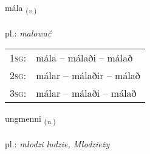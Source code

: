 \documentclass[frontgrid, backgrid]{flacards}\usepackage[]{graphicx}\usepackage[]{xcolor}
\begin{document}
\renewcommand{\flhead}{\vskip5pt \fboxsep=0pt {\small\bfseries\footnotesize Sagnorð | czasownik}}
\renewcommand{\fcfoot}{\vskip5pt \fboxsep=0pt \hspace{2pt}{\small\bfseries\footnotesize 3K}}

\renewcommand{\blhead}{\vskip5pt {\small\bfseries\footnotesize Sagnorð | czasownik }}
\renewcommand{\bcfoot}{\vskip5pt \hspace{2pt}{\small\bfseries\footnotesize 3K}}


{mála \small{\textsubscript{(\textit{v.})}} \\[1ex] %
\textphonetic{[mauːla]} \\
pl.: \emph{malować} \\  [2ex]
\renewcommand*{\arraystretch}{0.8}
\begin{tabular}{p{1cm}l}
\textsc{1sg}: & mála -- málaði -- málað \\ 
\textsc{2sg}: & málar -- málaðir -- málað \\ 
\textsc{3sg}: & málar -- málaði -- málað \\ 
\end{tabular}
}

\renewcommand{\flhead}{\vskip5pt \fboxsep=0pt {\small\bfseries\footnotesize Nafnorð | rzeczownik}}
\renewcommand{\fcfoot}{\vskip5pt \fboxsep=0pt \hspace{2pt}{\small\bfseries\footnotesize 3K}}

\renewcommand{\blhead}{\vskip5pt {\small\bfseries\footnotesize Nafnorð | rzeczownik }}
\renewcommand{\bcfoot}{\vskip5pt \hspace{2pt}{\small\bfseries\footnotesize 3K}}


{ungmenni \small{\textsubscript{(\textit{n.})}} \\[1ex] %
\textphonetic{[uŋkmɛnɪ]} \\
pl.: \emph{młodzi ludzie, Młodzieży} \\  [2ex]
\renewcommand*{\arraystretch}{0.8}
}
\end{document}
